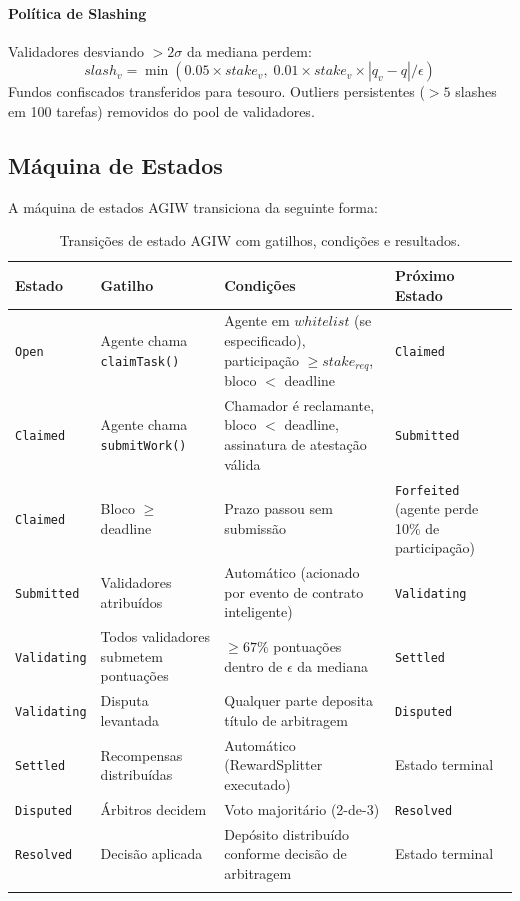 \documentclass[11pt]{article}
\begin{document}
\begin{itemize}[noitemsep]
\begin{itemize}[noitemsep]
\begin{itemize}[noitemsep]
\paragraph{Política de Slashing} Validadores desviando $>2\sigma$ da mediana perdem:
\begin{equation}
slash_v = \min(0.05 \times stake_v, \; 0.01 \times stake_v \times |q_v - q| / \epsilon)
\end{equation}
Fundos confiscados transferidos para tesouro. Outliers persistentes ($>5$ slashes em 100 tarefas) removidos do pool de validadores.

\subsection{Máquina de Estados}
\label{sec:agiw-state-machine}
A máquina de estados AGIW transiciona da seguinte forma:
\begin{longtable}{@{}p{}p{}p{}p{}@{}}
\toprule
\textbf{Estado} & \textbf{Gatilho} & \textbf{Condições} & \textbf{Próximo Estado} \\\midrule
\texttt{Open} & Agente chama \texttt{claimTask()} & Agente em $whitelist$ (se especificado), participação $\geq stake_{req}$, bloco $<$ deadline & \texttt{Claimed} \\
\texttt{Claimed} & Agente chama \texttt{submitWork()} & Chamador é reclamante, bloco $<$ deadline, assinatura de atestação válida & \texttt{Submitted} \\
\texttt{Claimed} & Bloco $\geq$ deadline & Prazo passou sem submissão & \texttt{Forfeited} (agente perde 10\% de participação) \\
\texttt{Submitted} & Validadores atribuídos & Automático (acionado por evento de contrato inteligente) & \texttt{Validating} \\
\texttt{Validating} & Todos validadores submetem pontuações & $\geq 67\%$ pontuações dentro de $\epsilon$ da mediana & \texttt{Settled} \\
\texttt{Validating} & Disputa levantada & Qualquer parte deposita título de arbitragem & \texttt{Disputed} \\
\texttt{Settled} & Recompensas distribuídas & Automático (RewardSplitter executado) & Estado terminal \\
\texttt{Disputed} & Árbitros decidem & Voto majoritário (2-de-3) & \texttt{Resolved} \\
\texttt{Resolved} & Decisão aplicada & Depósito distribuído conforme decisão de arbitragem & Estado terminal \\\bottomrule
\caption{Transições de estado AGIW com gatilhos, condições e resultados.}
\label{tab:agiw-states}
\end{longtable}


\end{itemize}
\end{itemize}
\end{itemize}
\end{document}
